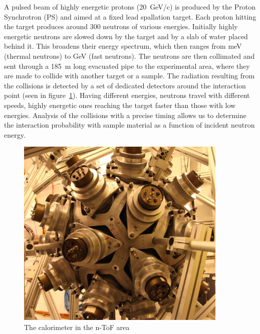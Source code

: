 A pulsed beam of highly energetic protons (20~GeV/c) is produced by the Proton Synchrotron (PS) and aimed at a fixed lead spallation target. Each proton hitting the target produces around 300 neutrons of various energies. Initially highly energetic neutrons are slowed down by the target and by a slab of water placed behind it. This broadens their energy spectrum, which then ranges from meV (thermal neutrons) to GeV (fast neutrons). The neutrons are then collimated and sent through a 185~m long evacuated pipe to the experimental area, where they are made to collide with another target or a sample. The radiation resulting from the collisions is detected by a set of dedicated detectors around the interaction point (seen in figure~\ref{fig:ntof}). Having different energies, neutrons travel with different speeds, highly energetic ones reaching the target faster than those with low energies. Analysis of the collisions with a precise timing allows us to determine the interaction probability with sample material as a function of incident neutron energy.
\begin{figure}[!t]
\centering
\includegraphics[width=0.9\textwidth]{01_introduction/pics/ntof}
\caption{The calorimeter in the n-ToF area \cite{Maximilien:1304589}}
\label{fig:ntof}
\end{figure}


